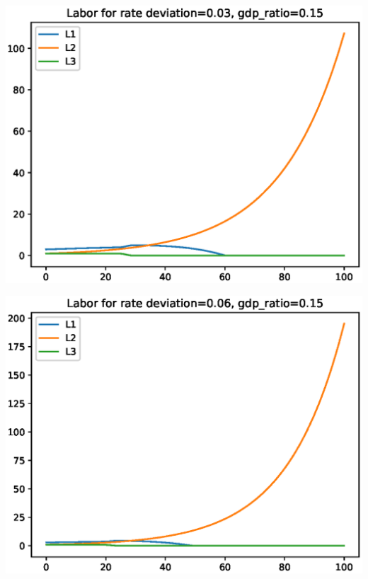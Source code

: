 \documentclass[12pt]{article}
\theoremstyle{definition}
\begin{document}
\begin{minipage}{\linewidth}
\begin{framed}
\begin{minipage}[t]{.48\textwidth}
\centering
\includegraphics[width=1\textwidth]{images/econ_1_run_0_labor}
\end{minipage}\hfill
\begin{minipage}[t]{.48\textwidth}
\centering
\includegraphics[width=1\textwidth]{images/econ_1_run_1_labor}
\end{minipage}\hfill
\begin{minipage}[t]{.48\textwidth}
\centering

\end{minipage}
\end{framed}
\end{minipage}
\end{document}
